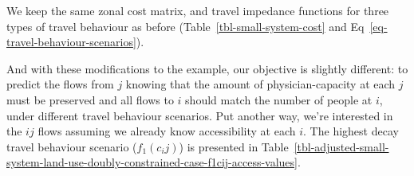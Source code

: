 \documentclass[
  10pt,
  letterpaper,
]{article}
\begin{document}
We keep the same zonal cost matrix, and travel impedance functions for
three types of travel behaviour as before
(Table~\ref{tbl-small-system-cost} and
Eq~\ref{eq-travel-behaviour-scenarios}).

\begin{table}

\caption{\label{tbl-small-system-land-use-doubly-constrained-case}Modified
simple system with three zones reflecting matched population and
opportunities. Population is in 10,000 persons and opportunities in
10,000 of physician-capacity.}


\end{table}%

And with these modifications to the example, our objective is slightly
different: to predict the flows from \(j\) knowing that the amount of
physician-capacity at each \(j\) must be preserved and all flows to
\(i\) should match the number of people at \(i\), under different travel
behaviour scenarios. Put another way, we're interested in the \(ij\)
flows assuming we already know accessibility at each \(i\). The highest
decay travel behaviour scenario (\(f_1(c_ij)\)) is presented in
Table~\ref{tbl-adjusted-small-system-land-use-doubly-constrained-case-f1cij-access-values}.

\begin{table}

\caption{\label{tbl-adjusted-small-system-land-use-doubly-constrained-case-f1cij-access-values}Doubly
constrained accessible opportunities assuming highest travel decay in
the modified simple system.}


\end{table}%
\end{document}
